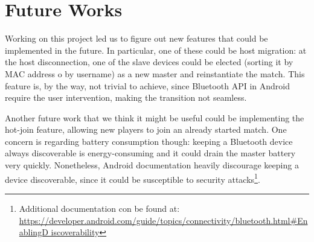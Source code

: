 \section{Future Works}

Working on this project led us to figure out new features that could be 
implemented in the future. In particular, one of these could be host migration: 
at the host disconnection, one of the slave devices could be elected (sorting it 
by MAC address o by username) as a new master and reinstantiate the match. This 
feature is, by the way, not trivial to achieve, since Bluetooth API in Android 
require the user intervention, making the transition not seamless.

Another future work that we think it might be useful could be implementing 
the hot-join feature, allowing new players to join an already started match. 
One concern is regarding battery consumption though: keeping a Bluetooth device 
always discoverable is energy-consuming and it could drain the master battery 
very quickly. Nonetheless, Android documentation heavily discourage keeping a 
device discoverable, since it could be susceptible to security 
attacks\footnote{Additional documentation con be found at: \url{ 
https://developer.android.com/guide/topics/connectivity/bluetooth.html#EnablingD 
iscoverability}}.